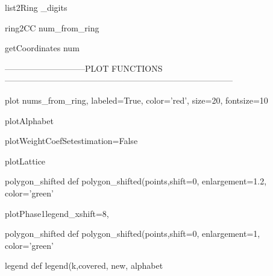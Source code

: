 \begin{method}{list2Ring}{ \_digits}

\end{method}


\begin{method}{ring2CC}{ num\_from\_ring}

\end{method}


\begin{method}{getCoordinates}{ num}

\end{method}


-----------------------------PLOT FUNCTIONS---------------------------------------------------------------------------------

\begin{method}{plot}{ nums\_from\_ring, labeled=True, color='red', size=20, fontsize=10}

\end{method}


\begin{method}{plotAlphabet}{}

\end{method}


\begin{method}{plotWeightCoefSet}{estimation=False}

\end{method}


\begin{method}{plotLattice}{}

\end{method}


\begin{method}{polygon\_shifted}{    def polygon\_shifted(points,shift=0, enlargement=1.2, color='green'}

\end{method}


\begin{method}{plotPhase1}{legend\_xshift=8,}

\end{method}


\begin{method}{polygon\_shifted}{    def polygon\_shifted(points,shift=0, enlargement=1, color='green'}

\end{method}


\begin{method}{legend}{    def legend(k,covered, new, alphabet}

\end{method}


